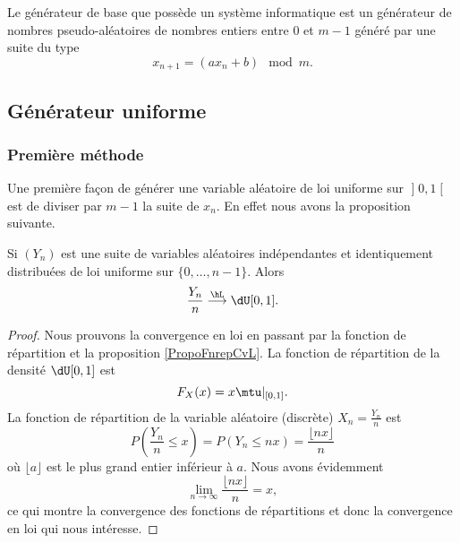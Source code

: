 Le générateur de base que possède un système informatique est un générateur de nombres pseudo-aléatoires de nombres entiers entre \( 0\) et \( m-1\) généré par une suite du type
\begin{equation}
    x_{n+1}=(ax_n+b)\mod m.
\end{equation}

\subsection{Générateur uniforme}

\subsubsection{Première méthode}

Une première façon de générer une variable aléatoire de loi uniforme sur \( \mathopen] 0 , 1 \mathclose[\) est de diviser par \( m-1\) la suite de \( x_n\). En effet nous avons la proposition suivante.

\begin{proposition}
    Si \( (Y_n)\) est une suite de variables aléatoires indépendantes et identiquement distribuées de loi uniforme sur \( \{ 0,\ldots,n-1 \}\). Alors
    \begin{equation}
        \frac{ Y_n }{ n }\stackrel{\hL}{\longrightarrow}\dU\mathopen[ 0 , 1 \mathclose].
    \end{equation}
\end{proposition}

\begin{proof}
    Nous prouvons la convergence en loi en passant par la fonction de répartition et la proposition \ref{PropoFnrepCvL}. La fonction de répartition de la densité \( \dU[0,1]\) est 
    \begin{equation}
        F_X(x)=x\mtu|_{\mathopen[ 0 , 1 \mathclose]}.
    \end{equation}
    La fonction de répartition de la variable aléatoire (discrète) \( X_n=\frac{ Y_n }{ n }\) est
    \begin{equation}
        P(\frac{ Y_n }{ n }\leq x)=P(Y_n\leq nx)=\frac{ \lfloor nx \rfloor }{ n }
    \end{equation}
    où \( \lfloor a\rfloor\) est le plus grand entier inférieur à \( a\). Nous avons évidemment 
    \begin{equation}
        \lim_{n\to \infty} \frac{ \lfloor nx\rfloor }{ n }=x,
    \end{equation}
    ce qui montre la convergence des fonctions de répartitions et donc la convergence en loi qui nous intéresse.
\end{proof}


